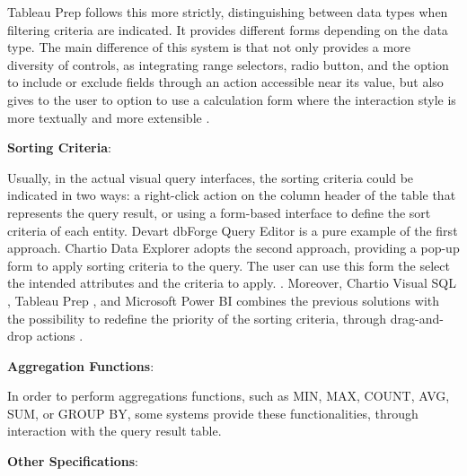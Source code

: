 Tableau Prep \cite{tableauPrep} follows this more strictly, distinguishing between data types when filtering criteria are indicated. It provides different forms depending on the data type. The main difference of this system is that not only provides a more diversity of controls, as integrating range selectors, radio button, and the option to include or exclude fields through an action accessible near its value, but also gives to the user to option to use a calculation form where the interaction style is more textually and more extensible \cite{tableauFilterYourData}.

\bigskip

\textbf{Sorting Criteria}: 

Usually, in the actual visual query interfaces, the sorting criteria could be indicated in two ways: a right-click action on the column header of the table that represents the query result, or using a form-based interface to define the sort criteria of each entity. Devart dbForge Query Editor \cite{dbForgeQueryBuilder} is a pure example of the first approach. \cite{dbForgeSortingData} Chartio Data Explorer \cite{chartioDataExplorer} adopts the second approach, providing a pop-up form to apply sorting criteria to the query. The user can use this form the select the intended attributes and the criteria to apply. \cite{chartioAdvancedSorting}. Moreover, Chartio Visual SQL \cite{chartioVisualSQL}, Tableau Prep \cite{tableauPrep}, and Microsoft Power BI \cite{powerBI} combines the previous solutions with the possibility to redefine the priority of the sorting criteria, through drag-and-drop actions \cite{visualSqlActions} \cite{tableauSortData} \cite{powerBIShapeAndCombineData}.

\bigskip

\textbf{Aggregation Functions}: 

In order to perform aggregations functions, such as MIN, MAX, COUNT, AVG, SUM, or GROUP BY, some systems provide these functionalities, through interaction with the query result table. 

\bigskip

\textbf{Other Specifications}: 


